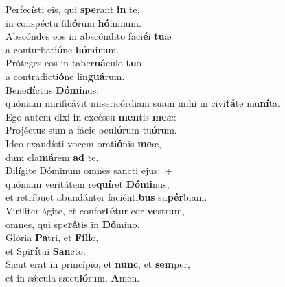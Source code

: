 \evenverse Perfecísti eis, qui \textbf{spe}rant \textbf{in} te,~\*\\
\evenverse in conspéctu fili\textbf{ó}rum \textbf{hó}minum.\\
\oddverse Abscóndes eos in abscóndito faci\textbf{é}i \textbf{tu}æ~\*\\
\oddverse a conturbati\textbf{ó}ne \textbf{hó}minum.\\
\evenverse Próteges eos in taber\textbf{ná}culo \textbf{tu}o~\*\\
\evenverse a contradicti\textbf{ó}ne lin\textbf{guá}rum.\\
\oddverse Bene\textbf{dí}ctus \textbf{Dó}\textbf{mi}nus:~\*\\
\oddverse quóniam mirificávit misericórdiam suam mihi in civi\textbf{tá}te mu\textbf{ní}ta.\\
\evenverse Ego autem dixi in excéssu \textbf{men}tis \textbf{me}æ:~\*\\
\evenverse Projéctus sum a fácie ocu\textbf{ló}rum tu\textbf{ó}rum.\\
\oddverse Ideo exaudísti vocem orati\textbf{ó}nis \textbf{me}æ,~\*\\
\oddverse dum cla\textbf{má}rem \textbf{ad} te.\\
\evenverse Dilígite Dóminum omnes sancti ejus:~+\\
\evenverse  quóniam veritátem re\textbf{quí}ret \textbf{Dó}\textbf{mi}nus,~\*\\
\evenverse et retríbuet abundánter faciénti\textbf{bus} su\textbf{pér}biam.\\
\oddverse Viríliter ágite, et confor\textbf{té}tur cor \textbf{ve}strum,~\*\\
\oddverse omnes, qui spe\textbf{rá}tis in \textbf{Dó}mino.\\
\evenverse Glória \textbf{Pa}tri, et \textbf{Fí}\textbf{li}o,~\*\\
\evenverse et Spi\textbf{rí}tui \textbf{San}cto.\\
\oddverse Sicut erat in princípio, et \textbf{nunc}, et \textbf{sem}per,~\*\\
\oddverse et in sǽcula sæcu\textbf{ló}rum. \textbf{A}men.\\
